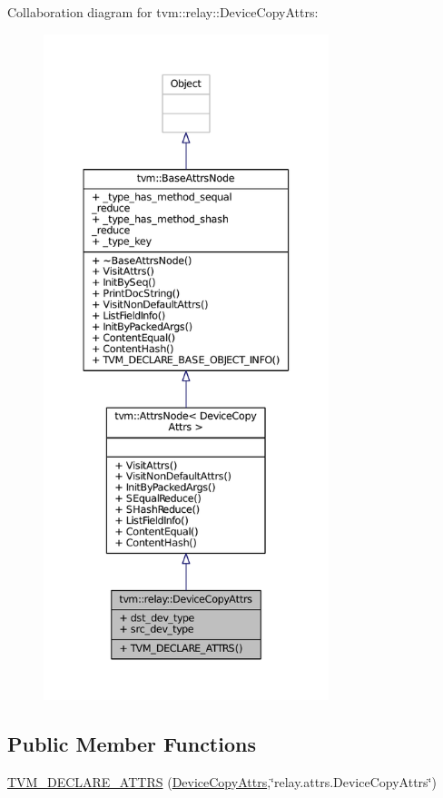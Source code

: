 Collaboration diagram for tvm\+:\+:relay\+:\+:Device\+Copy\+Attrs\+:
\nopagebreak
\begin{figure}[H]
\begin{center}
\leavevmode
\includegraphics[height=550pt]{structtvm_1_1relay_1_1DeviceCopyAttrs__coll__graph}
\end{center}
\end{figure}
\subsection*{Public Member Functions}
\begin{DoxyCompactItemize}
\item 
\hyperlink{structtvm_1_1relay_1_1DeviceCopyAttrs_a9766873de6db9519897bdd724e997527}{T\+V\+M\+\_\+\+D\+E\+C\+L\+A\+R\+E\+\_\+\+A\+T\+T\+RS} (\hyperlink{structtvm_1_1relay_1_1DeviceCopyAttrs}{Device\+Copy\+Attrs},\char`\"{}relay.\+attrs.\+Device\+Copy\+Attrs\char`\"{})
\end{DoxyCompactItemize}
